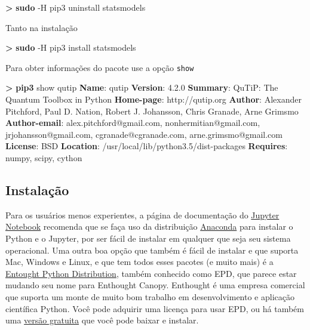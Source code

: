 \documentclass[11pt]{article}
\newenvironment{Shaded}{}{}
\newcommand{\KeywordTok}[1]{\textcolor[rgb]{0.00,0.44,0.13}{\textbf{{#1}}}}
\newcommand{\NormalTok}[1]{{#1}}
\begin{document}
\begin{Shaded}
\begin{Highlighting}[]
\KeywordTok{>} \KeywordTok{sudo} \NormalTok{-H pip3 uninstall statsmodels}
\end{Highlighting}
\end{Shaded}

Tanto na instalação

\begin{Shaded}
\begin{Highlighting}[]
\KeywordTok{>} \KeywordTok{sudo} \NormalTok{-H pip3 install statsmodels}
\end{Highlighting}
\end{Shaded}

Para obter informações do pacote use a opção \texttt{show}

\begin{Shaded}
\begin{Highlighting}[]
\KeywordTok{>} \KeywordTok{pip3} \NormalTok{show qutip}
\KeywordTok{Name}\NormalTok{: qutip}
\KeywordTok{Version}\NormalTok{: 4.2.0}
\KeywordTok{Summary}\NormalTok{: QuTiP: The Quantum Toolbox in Python}
\KeywordTok{Home-page}\NormalTok{: http://qutip.org}
\KeywordTok{Author}\NormalTok{: Alexander Pitchford, Paul D. Nation, Robert J. Johansson, Chris Granade, Arne Grimsmo}
\KeywordTok{Author-email}\NormalTok{: alex.pitchford@gmail.com, nonhermitian@gmail.com, jrjohansson@gmail.com, cgranade@cgranade.com, arne.grimsmo@gmail.com}
\KeywordTok{License}\NormalTok{: BSD}
\KeywordTok{Location}\NormalTok{: /usr/local/lib/python3.5/dist-packages}
\KeywordTok{Requires}\NormalTok{: numpy, scipy, cython}
\end{Highlighting}
\end{Shaded}

    \subsection{Instalação}\label{instalauxe7uxe3o}

Para os usuários menos experientes, a página de documentação do
\href{http://jupyter.org/}{Jupyter Notebook} recomenda que se faça uso
da distribuição \href{https://www.continuum.io/}{Anaconda} para instalar
o Python e o Jupyter, por ser fácil de instalar em qualquer que seja seu
sistema operacional. Uma outra boa opção que também é fácil de instalar
e que suporta Mac, Windows e Linux, e que tem todos esses pacotes (e
muito mais) é a \href{https://www.enthought.com/products/epd}{Entought
Python Distribution}, também conhecido como EPD, que parece estar
mudando seu nome para Enthought Canopy. Enthought é uma empresa
comercial que suporta um monte de muito bom trabalho em desenvolvimento
e aplicação científica Python. Você pode adquirir uma licença para usar
EPD, ou há também uma
\href{https://www.enthought.com/products/epd/free/}{versão gratuita} que
você pode baixar e instalar.
\end{document}
